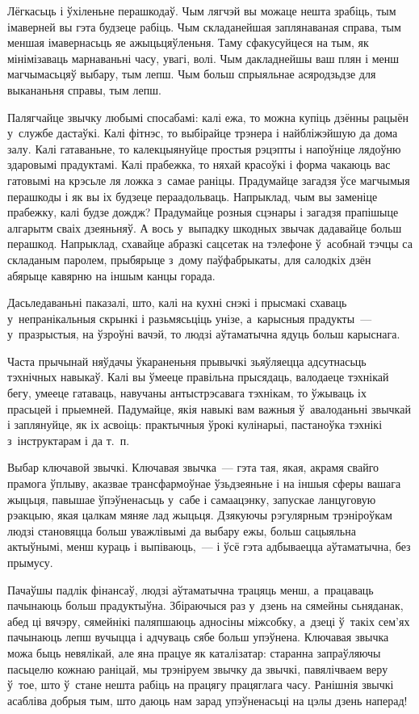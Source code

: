 Лёгкасьць і ўхіленьне перашкодаў. Чым лягчэй вы можаце нешта зрабіць, тым імаверней вы гэта будзеце рабіць. Чым складанейшая заплянаваная справа, тым меншая імавернасьць яе ажыцьцяўленьня. Таму сфакусуйцеся на тым, як мінімізаваць марнаваньні часу, увагі, волі. Чым дакладнейшы ваш плян і менш магчымасьцяў выбару, тым лепш. Чым больш спрыяльнае асяродзьдзе для выкананьня справы, тым лепш.

Палягчайце звычку любымі спосабамі: калі ежа, то можна купіць дзённы рацыён у~службе дастаўкі. Калі фітнэс, то выбірайце трэнера і найбліжэйшую да дома залу. Калі гатаваньне, то калекцыянуйце простыя рэцэпты і напоўніце лядоўню здаровымі прадуктамі. Калі прабежка, то няхай красоўкі і форма чакаюць вас гатовымі на крэсьле ля ложка з~самае раніцы. Прадумайце загадзя ўсе магчымыя перашкоды і як вы іх будзеце пераадольваць. Напрыклад, чым вы заменіце прабежку, калі будзе дождж? Прадумайце розныя сцэнары і загадзя прапішыце алгарытм сваіх дзеяньняў. А вось у~выпадку шкодных звычак дадавайце больш перашкод. Напрыклад, схавайце абразкі сацсетак на тэлефоне ў~асобнай тэчцы са складаным паролем, прыбярыце з~дому паўфабрыкаты, для салодкіх дзён абярыце кавярню на іншым канцы горада.

Дасьледаваньні паказалі, што, калі на кухні снэкі і прысмакі схаваць у~непранікальныя скрынкі і разьмясьціць унізе, а~карысныя прадукты~--- у~празрыстыя, на ўзроўні вачэй, то людзі аўтаматычна ядуць больш карыснага. 

Часта прычынай няўдачы ўкараненьня прывычкі зьяўляецца адсутнасьць тэхнічных навыкаў. Калі вы ўмееце правільна прысядаць, валодаеце тэхнікай бегу, умееце гатаваць, навучаны антыстрэсавага тэхнікам, то ўжываць іх прасьцей і прыемней. Падумайце, якія навыкі вам важныя ў~авалоданьні звычкай і заплянуйце, як іх асвоіць: практычныя ўрокі кулінарыі, пастаноўка тэхнікі з~інструктарам і да т.~п.

Выбар ключавой звычкі. Ключавая звычка~--- гэта тая, якая, акрамя свайго прамога ўплыву, аказвае трансфармоўнае ўзьдзеяньне і на іншыя сферы вашага жыцьця, павышае ўпэўненасьць у~сабе і самаацэнку, запускае ланцуговую рэакцыю, якая цалкам мяняе лад жыцьця. Дзякуючы рэгулярным трэніроўкам людзі становяцца больш уважлівымі да выбару ежы, больш сацыяльна актыўнымі, менш кураць і выпіваюць,~--- і ўсё гэта адбываецца аўтаматычна, без прымусу.

Пачаўшы падлік фінансаў, людзі аўтаматычна трацяць менш, а~працаваць пачынаюць больш прадуктыўна. Збіраючыся раз у~дзень на сямейны сьняданак, абед ці вячэру, сямейнікі паляпшаюць адносіны міжсобку, а~дзеці ў~такіх сем'ях пачынаюць лепш вучыцца і адчуваць сябе больш упэўнена. Ключавая звычка можа быць невялікай, але яна працуе як каталізатар: старанна запраўляючы пасьцелю кожнаю раніцай, мы трэніруем звычку да звычкі, павялічваем веру ў~тое, што ў~стане нешта рабіць на працягу працяглага часу. Ранішнія звычкі асабліва добрыя тым, што даюць нам зарад упэўненасьці на цэлы дзень наперад!


